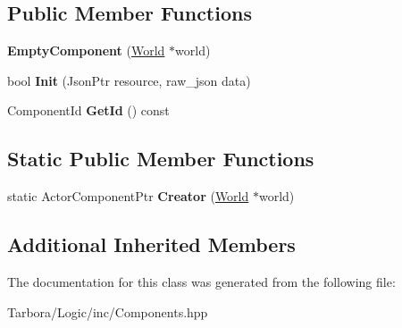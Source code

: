 \subsection*{Public Member Functions}
\begin{DoxyCompactItemize}
\item 
\mbox{\label{classTarbora_1_1EmptyComponent_a1d7d043e5bc46e44c0f6eac1bb3990c3}} 
{\bfseries Empty\+Component} (\hyperlink{classTarbora_1_1World}{World} $\ast$world)
\item 
\mbox{\label{classTarbora_1_1EmptyComponent_ae3c9b5e69b060f82b73fb4e467fb0498}} 
bool {\bfseries Init} (Json\+Ptr resource, raw\+\_\+json data)
\item 
\mbox{\label{classTarbora_1_1EmptyComponent_a029c567c28635d6342038a44ff75d59f}} 
Component\+Id {\bfseries Get\+Id} () const
\end{DoxyCompactItemize}
\subsection*{Static Public Member Functions}
\begin{DoxyCompactItemize}
\item 
\mbox{\label{classTarbora_1_1EmptyComponent_ad7f0e222ad2aee4729190ee3b701b156}} 
static Actor\+Component\+Ptr {\bfseries Creator} (\hyperlink{classTarbora_1_1World}{World} $\ast$world)
\end{DoxyCompactItemize}
\subsection*{Additional Inherited Members}


The documentation for this class was generated from the following file\+:\begin{DoxyCompactItemize}
\item 
Tarbora/\+Logic/inc/Components.\+hpp\end{DoxyCompactItemize}
